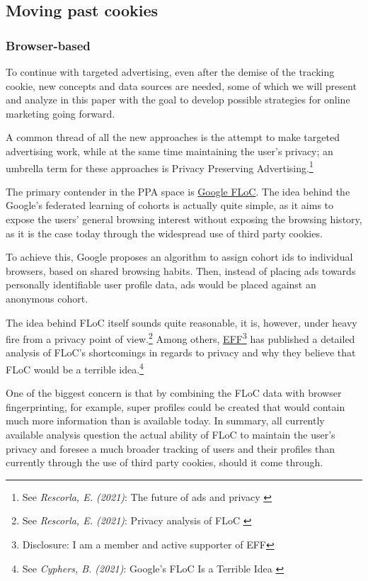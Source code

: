 \subsection{Moving past cookies}

\subsubsection{Browser-based}

To continue with targeted advertising, even after the demise of the tracking cookie, new concepts and data sources are needed, some of which we will present and analyze in this paper with the goal to develop possible strategies for online marketing going forward.

A common thread of all the new approaches is the attempt to make targeted advertising work, while at the same time maintaining the user's privacy; an umbrella term for these approaches is Privacy Preserving Advertising.\footnote{See \textit{Rescorla, E. (2021)}: The future of ads and privacy \cite{futureAds}}

The primary contender in the PPA space is \href{https://wicg.github.io/floc/}{Google FLoC}. The idea behind the Google's federated learning of cohorts is actually quite simple, as it aims to expose the users' general browsing interest without exposing the browsing history, as it is the case today through the widespread use of third party cookies.

To achieve this, Google proposes an algorithm to assign cohort ids to individual browsers, based on shared browsing habits. Then, instead of placing ads towards personally identifiable user profile data, ads would be placed against an anonymous cohort. 

The idea behind FLoC itself sounds quite reasonable, it is, however, under heavy fire from a privacy point of view.\footnote{See \textit{Rescorla, E. (2021)}: Privacy analysis of FLoC \cite{privacyFloc}} Among others, \href{https://www.eff.org/}{EFF}\footnote{Disclosure: I am a member and active supporter of EFF} has published a detailed analysis of FLoC's shortcomings in regards to privacy and why they believe that FLoC would be a terrible idea.\footnote{See \textit{Cyphers, B. (2021)}: Google’s FLoC Is a Terrible Idea \cite{terribleIdea}}

One of the biggest concern is that by combining the FLoC data with browser fingerprinting, for example, super profiles could be created that would contain much more information than is available today. In summary, all currently available analysis question the actual ability of FLoC to maintain the user's privacy and foresee a much broader tracking of users and their profiles than currently through the use of third party cookies, should it come through.

